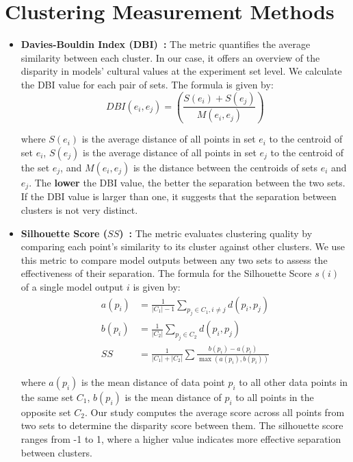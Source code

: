 \documentclass[11pt]{article}
\begin{document}
\section{Clustering Measurement Methods}
\label{appendix:clustering_measurement}
\begin{itemize}
    \item \textbf{Davies-Bouldin Index (DBI)~\cite{4766909}:} The metric quantifies the average similarity between each cluster.
    In our case, it offers an overview of the disparity in models' cultural values at the experiment set level. We calculate the DBI value for each pair of sets.
    The formula is given by:
    \begin{equation}
         DBI(e_i, e_j) = \left(\frac{S(e_i) + S(e_j)}{M(e_i, e_j)}\right)
    \end{equation}

    where \(S(e_i)\) is the average distance of all points in set \(e_i\) to the centroid of set \(e_i\), \(S(e_j)\) is the average distance of all points in set \(e_j\) to the centroid of the set \(e_j\), and \(M(e_i, e_j)\) is the distance between the centroids of sets \(e_i\) and \(e_j\). The \textbf{lower} the DBI value, the better the separation between the two sets. If the DBI value is larger than one, it suggests that the separation between clusters is not very distinct.

    \item \textbf{Silhouette Score ($SS$)~\cite{ROUSSEEUW198753}:} The metric evaluates clustering quality by comparing each point's similarity to its cluster against other clusters. We use this metric to compare model outputs between any two sets to assess the effectiveness of their separation. The formula for the Silhouette Score \( s(i) \) of a single model output \( i \) is given by:
    \begin{align}
        a(p_i) &= \frac{1}{| C_1 | -1} \sum_{p_j \in C_1 ,i \neq j} d(p_i, p_j) \\
        b(p_i) &= \frac{1}{| C_2 |} \sum_{p_j \in C_2 } d(p_i, p_j)   \\
        SS &= \frac{1}{|C_1| + |C_2|} \sum \frac{b(p_i) - a(p_i)}{\max(a(p_i), b(p_i))}
 \end{align}

    where \( a(p_i) \) is the mean distance of data point \( p_i \) to all other data points in the same set \(C_1\), \( b(p_i) \) is the mean distance of \( p_i \) to all points in the opposite set \(C_2\). Our study computes the average score across all points from two sets to determine the disparity score between them. The silhouette score ranges from -1 to 1, where a higher value indicates more effective separation between clusters.
\end{itemize}
\end{document}
